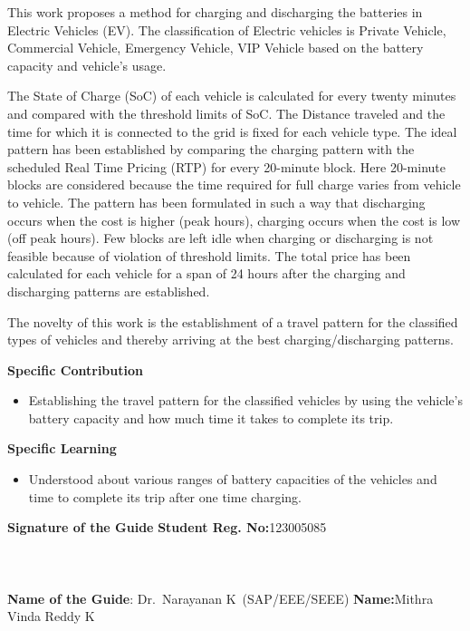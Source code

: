 \documentclass[a4paper, 12pt, oneside]{sastra}
\begin{document}
	\noindent This work proposes a method for charging and discharging the batteries in Electric Vehicles (EV). The classification of Electric vehicles is Private Vehicle, Commercial Vehicle, Emergency Vehicle, VIP Vehicle based on the battery capacity and vehicle's usage.
	
	\noindent The State of Charge (SoC) of each vehicle is calculated for every twenty minutes and compared with the threshold limits of SoC. The Distance traveled and the time for which it is connected to the grid is fixed for each vehicle type. The ideal pattern has been established by comparing the charging pattern with the scheduled Real Time Pricing (RTP) for every 20-minute block. Here 20-minute blocks are considered because the time required for full charge varies from vehicle to vehicle. The pattern has been formulated in such a way that discharging occurs when the cost is higher (peak hours), charging occurs when the cost is low (off peak hours). Few blocks are left idle when charging or discharging is not feasible because of violation of threshold limits. The total price has been calculated for each vehicle for a span of 24 hours after the charging and discharging patterns are established.
	
	\noindent The novelty of this work is the establishment of a travel pattern for the classified types of vehicles and thereby arriving at the best charging/discharging patterns.
	
	
	\noindent \textbf{Specific Contribution}
	\begin{itemize}
		\item Establishing the travel pattern for the classified vehicles by using the vehicle's battery capacity and how much time it takes to complete its trip.
		
	\end{itemize}
	\noindent \textbf{Specific Learning}
	\begin{itemize}
		\item Understood about various ranges of battery capacities of the vehicles and time to complete its trip after one time charging.
	\end{itemize}
	
	\vspace*{24pt}
	
	\noindent \textbf{Signature of the Guide} \hspace*{66mm} \textbf{Student Reg. No:}123005085\\
		\\
	\\
	\\
	\noindent \textbf{Name of the Guide}:{ Dr.~Narayanan K}~(SAP/EEE/SEEE) \hspace*{7mm} \textbf{Name:}{Mithra Vinda Reddy K}
	\pagebreak
	
\end{document}
